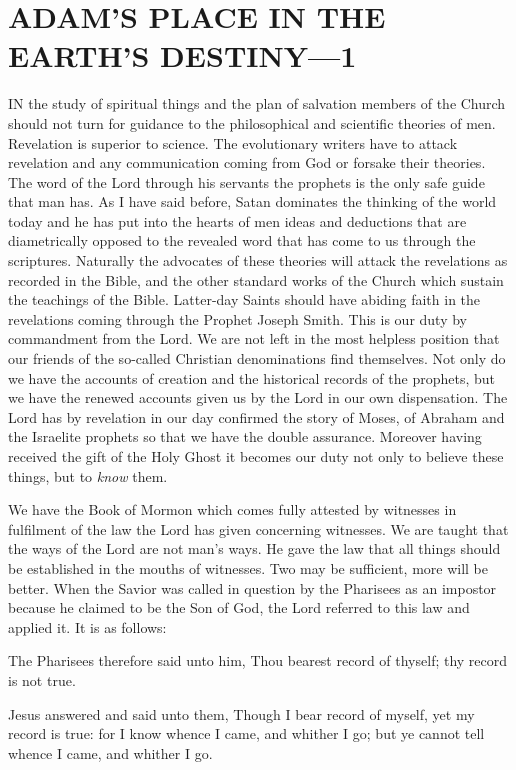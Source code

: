 \chapter{ADAM'S PLACE IN THE EARTH'S DESTINY—1}

IN the study of spiritual things and the plan of salvation members of the Church should not
turn for guidance to the philosophical and scientific theories of men. Revelation is superior to
science. The evolutionary writers have to attack revelation and any communication coming
from God or forsake their theories. The word of the Lord through his servants the prophets is
the only safe guide that man has. As I have said before, Satan dominates the thinking of the
world today and he has put into the hearts of men ideas and deductions that are diametrically
opposed to the revealed word that has come to us through the scriptures. Naturally the
advocates of these theories will attack the revelations as recorded in the Bible, and the other
standard works of the Church which sustain the teachings of the Bible. Latter-day Saints
should have abiding faith in the revelations coming through the Prophet Joseph Smith. This
is our duty by commandment from the Lord. We are not left in the most helpless position that
our friends of the so-called Christian denominations find themselves. Not only do we have
the accounts of creation and the historical records of the prophets, but we have the renewed
accounts given us by the Lord in our own dispensation. The Lord has by revelation in our day
confirmed the story of Moses, of Abraham and the Israelite prophets so that we have the
double assurance. Moreover having received the gift of the Holy Ghost it becomes our duty
not only to believe these things, but to \textit{know} them.

We have the Book of Mormon which comes fully attested by witnesses in fulfilment of the
law the Lord has given concerning witnesses. We are taught that the ways of the Lord are not
man's ways. He gave the law that all things should be established in the mouths of witnesses.
Two may be sufficient, more will be better. When the Savior was called in question by the
Pharisees as an impostor because he claimed to be the Son of God, the Lord referred to this
law and applied it. It is as follows:

The Pharisees therefore said unto him, Thou bearest record of thyself; thy record is not true.

Jesus answered and said unto them, Though I bear record of myself, yet my record is true: for
I know whence I came, and whither I go; but ye cannot tell whence I came, and whither I go.

